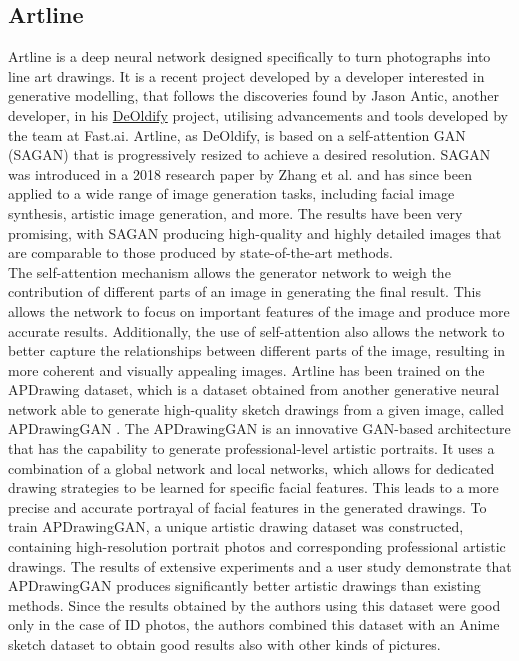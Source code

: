 \subsection{Artline}
Artline is a deep neural network designed specifically to turn photographs into line art drawings. It is a recent project developed by a developer interested in generative modelling, that follows the discoveries found by Jason Antic, another developer, in his \href{https://github.com/jantic/DeOldify}{DeOldify} project, utilising advancements and tools developed by the team at Fast.ai. Artline, as DeOldify, is based on a self-attention GAN (SAGAN) that is progressively resized to achieve a desired resolution. SAGAN was introduced in a 2018 research paper by Zhang et al.\cite{SaGAN} and has since been applied to a wide range of image generation tasks, including facial image synthesis, artistic image generation, and more. The results have been very promising, with SAGAN producing high-quality and highly detailed images that are comparable to those produced by state-of-the-art methods. \\
The self-attention mechanism allows the generator network to weigh the contribution of different parts of an image in generating the final result. This allows the network to focus on important features of the image and produce more accurate results. Additionally, the use of self-attention also allows the network to better capture the relationships between different parts of the image, resulting in more coherent and visually appealing images.
Artline has been trained on the APDrawing dataset, which is a dataset obtained from another generative neural network able to generate high-quality sketch drawings from a given image, called APDrawingGAN \cite{APDrawingGAN}. The APDrawingGAN is an innovative GAN-based architecture that has the capability to generate professional-level artistic portraits. It uses a combination of a global network and local networks, which allows for dedicated drawing strategies to be learned for specific facial features. This leads to a more precise and accurate portrayal of facial features in the generated drawings. To train APDrawingGAN, a unique artistic drawing dataset was constructed, containing high-resolution portrait photos and corresponding professional artistic drawings. The results of extensive experiments and a user study demonstrate that APDrawingGAN produces significantly better artistic drawings than existing methods. Since the results obtained by the authors using this dataset were good only in the case of ID photos, the authors combined this dataset with an Anime sketch dataset to obtain good results also with other kinds of pictures.

